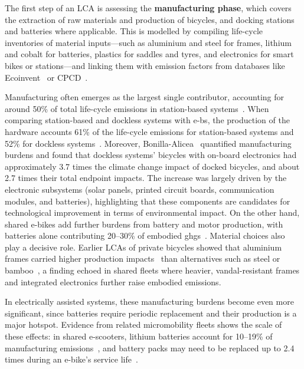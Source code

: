         The first step of an LCA is assessing the \textbf{manufacturing phase}, which covers the extraction of raw materials and production of bicycles, and docking stations and batteries where applicable. This is modelled by compiling life-cycle inventories of material inputs—such as aluminium and steel for frames, lithium and cobalt for batteries, plastics for saddles and tyres, and electronics for smart bikes or stations—and linking them with emission factors from databases like Ecoinvent~\cite{Felipe-Falgas2022} or CPCD~\cite{Zhu2023}. 

        Manufacturing often emerges as the largest single contributor, accounting for around 50\% of total life-cycle emissions in station-based systems~\cite{Calan2024, Sun2022}. When comparing station-based and dockless systems with \acp{e-b}, the production of the hardware accounts 61\% of the life-cycle emissions for station-based systems and 52\% for dockless systems~\cite{Luo2019}. Moreover, Bonilla-Alicea~\cite{Bonilla-Alicea2020} quantified manufacturing burdens and found that dockless systems' bicycles with on-board electronics had approximately 3.7 times the climate change impact of docked bicycles, and about 2.7 times their total endpoint impacts. The increase was largely driven by the electronic subsystems (solar panels, printed circuit boards, communication modules, and batteries), highlighting that these components are candidates for technological improvement in terms of environmental impact. On the other hand, shared e-bikes add further burdens from battery and motor production, with batteries alone contributing 20–30\% of embodied \acp{ghg}~\cite{Zhu2023}. Material choices also play a decisive role. Earlier LCAs of private bicycles showed that aluminium frames carried higher production impacts~\cite{Dave2010, Leunberger2010, Luna2016} than alternatives such as steel or bamboo~\cite{Agyekum2017}, a finding echoed in shared fleets where heavier, vandal-resistant frames and integrated electronics further raise embodied emissions.

        In electrically assisted systems, these manufacturing burdens become even more significant, since batteries require periodic replacement and their production is a major hotspot. Evidence from related micromobility fleets shows the scale of these effects: in shared e-scooters, lithium batteries account for 10–19\% of manufacturing emissions~\cite{Calan2024}, and battery packs may need to be replaced up to 2.4 times during an e-bike’s service life~\cite{Calan2024}. 
        
